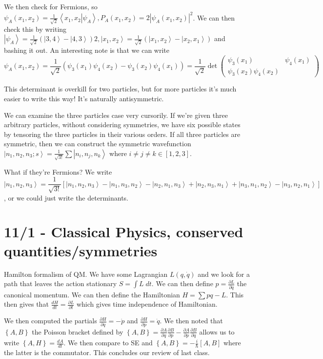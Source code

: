\documentclass[10pt]{report}
\newcommand{\ket}[1]{\left|#1\right>}
\newcommand{\dotp}[2]{\left<#1\left.\right|#2\right>}
\newcommand{\rd}[2]{\frac{d#1}{d#2}}
\newcommand{\pd}[2]{\frac{\partial #1}{\partial#2}}
\newcommand{\abs}[1]{\left|#1\right|}
\begin{document}
We then check for Fermions, so $\psi_A(x_1,x_2) = \frac{1}{\sqrt{2}}\dotp{x_1,x_2}{\psi_A}, P_A(x_1, x_2) = 2\abs{\psi_A(x_1,x_2)}^2$. We can then check this by writing $\ket{\psi_A}= \frac{1}{\sqrt{2}}\left(\ket{3,4} - \ket{4,3}\right)2, \ket{x_1, x_2} = \frac{1}{\sqrt{2}}\left( \ket{x_1,x_2} - \ket{x_2,x_1} \right)$ and bashing it out. An interesting note is that we can write
$$\psi_A(x_1,x_2) = \frac{1}{\sqrt{2}}\left( \psi_3(x_1)\psi_4(x_2) - \psi_3(x_2)\psi_4(x_1) \right) = \frac{1}{\sqrt{2}}\det \begin{pmatrix}\psi_3(x_1)&\psi_4(x_1)\\ \psi_3(x_2) \psi_4(x_2)\end{pmatrix}$$

This determinant is overkill for two particles, but for more particles it's much easier to write this way! It's naturally antisymmetric. 

We can examine the three particles case very cursorily. If we're given three arbitrary particles, without considering symmetries, we have six possible states by tensoring the three particles in their various orders. If all three particles are symmetric, then we can construct the symmetric wavefunction $\ket{n_1,n_2,n_3;s} = \frac{1}{\sqrt{3!}}\sum \ket{n_i, n_j, n_k}$ where $i\neq j \neq k \in [1,2,3]$. 

What if they're Fermions? We write
$$\ket{n_1,n_2,n_3} = \frac{1}{\sqrt{3!}}\left[ \ket{n_1,n_2,n_3} - \ket{n_1,n_3,n_2} - \ket{n_2,n_1,n_3} + \ket{n_2,n_3,n_1} + \ket{n_3,n_1,n_2} - \ket{n_3,n_2,n_1} \right]$$
, or we could just write the determinants.
\chapter{11/1 - Classical Physics, conserved quantities/symmetries}

Hamilton formalism of QM. We have some Lagrangian $L(q,\dot{q})$ and we look for a path that leaves the action stationary $S = \int L\; dt$. We can then define $p = \pd{L}{q}$ the canonical momentum. We can then define the Hamiltonian $H = \sum pq - L$. This then gives that $\rd{H}{t} = \pd{L}{t}$ which gives time independence of Hamiltonian.

We then computed the partials $\pd{H}{q} = -\dot{p}$ and $ \pd{H}{p} = \dot{q}$. We then noted that $\left\{ A,B \right\}$ the Poisson bracket defined by $\left\{ A,B \right\} = \pd{A}{q}\pd{B}{p} - \pd{A}{p} \pd{B}{q}$ allows us to write $\left\{ A,H \right\} = \rd{A}{t}$. We then compare to SE and $\left\{ A,B \right\} = -\frac{i}{\hbar}\left[ A,B \right]$ where the latter is the commutator. This concludes our review of last class.
\end{document}
